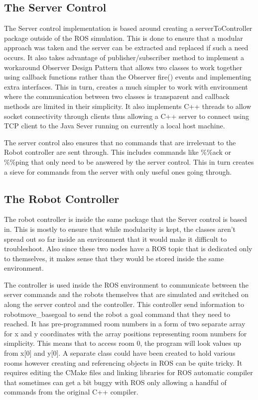     \subsection{The Server Control}
      The Server control implementation is based around creating a serverToController package outside of the ROS simulation. This is done to ensure that a modular approach was taken and the server can be extracted and replaced if such a need occurs. It also takes advantage of publisher/subscriber method to implement a workaround Observer Design Pattern that allows two classes to work together using callback functions rather than the Observer fire() events and implementing extra interfaces. This in turn, creates a much simpler to work with environment where the communication between two classes is transparent and callback methods are limited in their simplicity. It also implements C++ threads to allow socket connectivity through clients thus allowing a C++ server to connect using TCP client to the Java Sever running on currently a local host machine.

      The server control also ensures that no commands that are irrelevant to the Robot controller are sent through. This includes commands like \%\%ack or \%\%ping that only need to be answered by the server control. This in turn creates a sieve for commands from the server with only useful ones going through.

    \subsection{The Robot Controller}
      The robot controller is inside the same package that the Server control is based in. This is mostly to ensure that while modularity is kept, the classes aren't spread out so far inside an environment that it would make it difficult to troubleshoot. Also since these two nodes have a ROS topic that is dedicated only to themselves, it makes sense that they would be stored inside the same environment.

      The controller is used inside the ROS environment to communicate between the server commands and the robots themselves that are simulated and switched on along the server control and the controller. This controller send information to robot\/move\_base\/goal to send the robot a goal command that they need to reached. It has pre-programmed room numbers in a form of two separate array for x and y coordinates with the array positions representing room numbers for simplicity. This means that to access room 0, the program will look values up from x[0] and y[0]. A separate class could have been created to hold various rooms however creating and referencing objects in ROS can be quite tricky. It requires editing the CMake files and linking libraries for ROS automatic compiler that sometimes can get a bit buggy with ROS only allowing a handful of commands from the original C++ compiler.

